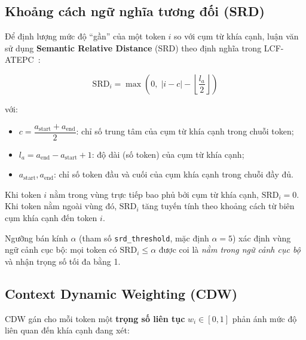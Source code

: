 \subsection{Khoảng cách ngữ nghĩa tương đối (SRD)}
\label{subsec:srd}

Để định lượng mức độ ``gần'' của một token $i$ so với cụm từ khía
cạnh, luận văn sử dụng \textbf{Semantic Relative Distance} (SRD) theo
định nghĩa trong LCF-ATEPC~\cite{zeng2019lcf}:

\begin{equation}
  \mathrm{SRD}_i = \max\!\left(0,\;
    \left|i - c\right| - \left\lfloor \frac{l_a}{2} \right\rfloor
  \right)
  \label{eq:srd}
\end{equation}

\noindent với:

\begin{itemize}
  \item $c = \dfrac{a_{\mathrm{start}} + a_{\mathrm{end}}}{2}$: chỉ số
    trung tâm của cụm từ khía cạnh trong chuỗi token;
  \item $l_a = a_{\mathrm{end}} - a_{\mathrm{start}} + 1$: độ dài (số
    token) của cụm từ khía cạnh;
  \item $a_{\mathrm{start}}, a_{\mathrm{end}}$: chỉ số token đầu và
    cuối của cụm khía cạnh trong chuỗi đầy đủ.
\end{itemize}

Khi token $i$ nằm trong vùng trực tiếp bao phủ bởi cụm từ khía cạnh,
$\mathrm{SRD}_i = 0$.  Khi token nằm ngoài vùng đó, $\mathrm{SRD}_i$
tăng tuyến tính theo khoảng cách từ biên cụm khía cạnh đến token $i$.

Ngưỡng bán kính $\alpha$ (tham số \texttt{srd\_threshold}, mặc định
$\alpha = 5$) xác định vùng ngữ cảnh cục bộ: mọi token có
$\mathrm{SRD}_i \leq \alpha$ được coi là \textit{nằm trong ngữ cảnh
cục bộ} và nhận trọng số tối đa bằng 1.

\subsection{Context Dynamic Weighting (CDW)}
\label{subsec:cdw}

CDW gán cho mỗi token một \textbf{trọng số liên tục} $w_i \in [0, 1]$
phản ánh mức độ liên quan đến khía cạnh đang xét:

